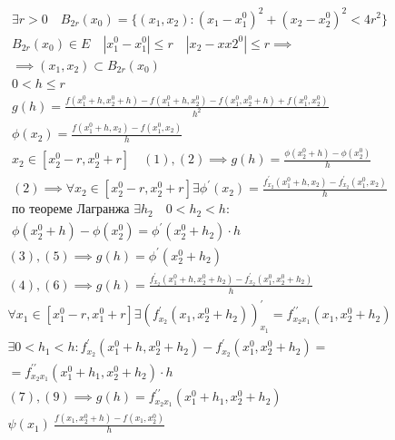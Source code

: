 \documentclass[main]{subfiles}
\begin{document}
        \begin{longProof}
            \begin{gather*}
                \exists r > 0 \quad B_{2r}(x_0) = \{ (x_1,x_2) : (x_1-x_1^0)^2 + (x_2-x_2^0)^2 < 4r^2 \} \\
                B_{2r}(x_0) \in E \quad |x_1^0 - x_1^0| \leq r \quad |x_2-xx2^0| \leq r \implies \\
                \implies (x_1,x_2) \subset B_{2r}(x_0) \\
                0 < h \leq r \\
                g(h) = \frac{f(x_1^0+h,x_2^0+h)-f(x_1^0+h,x_2^0) - f(x_1^0,x_2^0+h) + f(x_1^0,x_2^0)}{h^2} \tag{1}\\
                \phi(x_2) = \frac{f(x_1^0+h,x_2) - f(x_1^0,x_2)}{h} \tag{2}\\
                x_2 \in [x_2^0-r, x_2^0+r]  \quad (1),(2) \implies g(h) = \frac{\phi(x_2^0+h)-\phi(x_2^0)}{h} \tag{3} \\
                (2) \implies \forall x_2 \in [x^0_2 - r, x^0_2 + r] \exists \phi^\prime(x_2) = \frac{f^\prime_{x_2}(x_1^0+h,x_2)-f^\prime_{x_2}(x_1^0,x_2)}{h} \tag{4}\\
                \text{по теореме Лагранжа } \exists h_2 \quad 0 < h_2 < h : \\
                \phi(x_2^0+h) - \phi(x_2^0) = \phi^\prime(x_2^0+h_2) \cdot h \tag{5}
            \end{gather*}
            \begin{gather*}
                (3),(5) \implies g(h) = \phi^\prime(x_2^0 + h_2) \tag{6}\\
                (4),(6) \implies g(h) = \frac{f^\prime_{x_2}(x_1^0+h,x_2^0+h_2)-f^\prime_{x_2}(x_1^0,x^0_2 + h_2)}{h} \tag{7}\\
                \forall x_1 \in [x_1^0-r,x_1^0+r] \exists (f^\prime_{x_2}(x_1,x_2^0+h_2))^\prime_{x_1} = f^{\prime\prime}_{x_2x_1}(x_1,x_2^0+h_2) \tag{8}\\
                \exists 0 < h_1 < h : f^\prime_{x_2}(x_1^0+h,x_2^0+h_2) - f^\prime_{x_2}(x_1^0,x_2^0+h_2) =\\=
                f^{\prime\prime}_{x_2x_1}(x_1^0 + h_1, x_2^0 + h_2) \cdot h \tag{9}\\
                (7),(9) \implies g(h) = f^{\prime\prime}_{x_2x_1}(x_1^0+h_1,x_2^0 + h_2) \tag{10}\\
                \psi(x_1) \ \frac{f(x_1,x_2^0+h)-f(x_1,x_2^0)}{h} \tag{11}
            \end{gather*}

\end{longProof}
\end{document}
